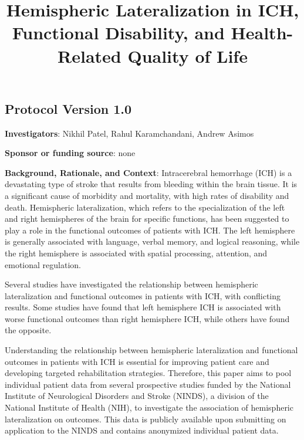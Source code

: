 \documentclass[
  letterpaper,
  DIV=11,
  numbers=noendperiod]{scrartcl}
\title{Hemispheric Lateralization in ICH, Functional Disability, and
Health-Related Quality of Life}
\author{}
\date{}
\begin{document}
\maketitle
\ifdefined\Shaded\renewenvironment{Shaded}{\begin{tcolorbox}[sharp corners, frame hidden, interior hidden, borderline west={3pt}{0pt}{shadecolor}, enhanced, breakable, boxrule=0pt]}{\end{tcolorbox}}\fi

\hypertarget{protocol-version-1.0}{%
\subsection{Protocol Version 1.0}\label{protocol-version-1.0}}

\textbf{Investigators}: Nikhil Patel, Rahul Karamchandani, Andrew Asimos

\textbf{Sponsor or funding source}: none

\textbf{Background, Rationale, and Context}: Intracerebral hemorrhage
(ICH) is a devastating type of stroke that results from bleeding within
the brain tissue. It is a significant cause of morbidity and mortality,
with high rates of disability and death. Hemispheric lateralization,
which refers to the specialization of the left and right hemispheres of
the brain for specific functions, has been suggested to play a role in
the functional outcomes of patients with ICH. The left hemisphere is
generally associated with language, verbal memory, and logical
reasoning, while the right hemisphere is associated with spatial
processing, attention, and emotional regulation.

Several studies have investigated the relationship between hemispheric
lateralization and functional outcomes in patients with ICH, with
conflicting results. Some studies have found that left hemisphere ICH is
associated with worse functional outcomes than right hemisphere ICH,
while others have found the opposite.

Understanding the relationship between hemispheric lateralization and
functional outcomes in patients with ICH is essential for improving
patient care and developing targeted rehabilitation strategies.
Therefore, this paper aims to pool individual patient data from several
prospective studies funded by the National Institute of Neurological
Disorders and Stroke (NINDS), a division of the National Institute of
Health (NIH), to investigate the association of hemispheric
lateralization on outcomes. This data is publicly available upon
submitting on application to the NINDS and contains anonymized
individual patient data.
\end{document}
